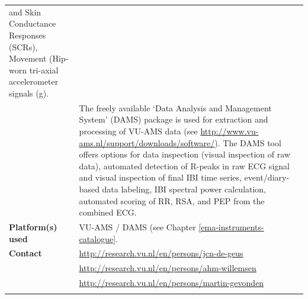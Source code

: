 \documentclass[]{book}
\begin{document}
\begin{longtable}[]{@{}ll@{}}
\begin{minipage}[t]{0.69\columnwidth}
and Skin Conductance Responses (SCRs), Movement (Hip-worn tri-axial
accelerometer signals (g).\strut
\end{minipage}\tabularnewline
\begin{minipage}[t]{0.25\columnwidth}\raggedright\strut
\strut
\end{minipage} & \begin{minipage}[t]{0.69\columnwidth}\raggedright\strut
The freely available `Data Analysis and Management System' (DAMS)
package is used for extraction and processing of VU-AMS data (see
\url{http://www.vu-ams.nl/support/downloads/software/}). The DAMS tool
offers options for data inspection (visual inspection of raw data),
automated detection of R-peaks in raw ECG signal and visual inspection
of final IBI time series, event/diary-based data labeling, IBI spectral
power calculation, automated scoring of RR, RSA, and PEP from the
combined ECG.\strut
\end{minipage}\tabularnewline
\begin{minipage}[t]{0.25\columnwidth}\raggedright\strut
\textbf{Platform(s) used}\strut
\end{minipage} & \begin{minipage}[t]{0.69\columnwidth}\raggedright\strut
VU-AMS / DAMS (see Chapter \ref{ema-instruments-catalogue}.\strut
\end{minipage}\tabularnewline
\begin{minipage}[t]{0.25\columnwidth}\raggedright\strut
\textbf{Contact}\strut
\end{minipage} & \begin{minipage}[t]{0.69\columnwidth}\raggedright\strut
\url{http://research.vu.nl/en/persons/jcn-de-geus}\strut
\end{minipage}\tabularnewline
\begin{minipage}[t]{0.25\columnwidth}\raggedright\strut
\strut
\end{minipage} & \begin{minipage}[t]{0.69\columnwidth}\raggedright\strut
\url{http://research.vu.nl/en/persons/ahm-willemsen}\strut
\end{minipage}\tabularnewline
\begin{minipage}[t]{0.25\columnwidth}\raggedright\strut
\strut
\end{minipage} & \begin{minipage}[t]{0.69\columnwidth}\raggedright\strut
\url{http://research.vu.nl/en/persons/martin-gevonden}\strut
\end{minipage}\tabularnewline
\begin{minipage}[t]{0.25\columnwidth}\raggedright\strut

\end{minipage}
\end{longtable}
\end{document}
